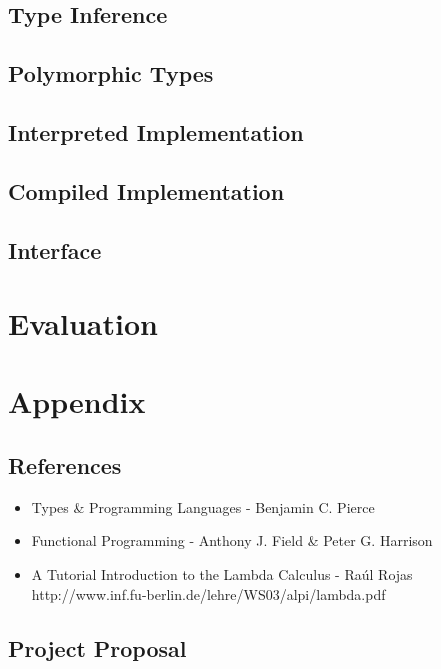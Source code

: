 \documentclass{article}
\begin{document}
\subsection{Type Inference}
\subsection{Polymorphic Types}
\subsection{Interpreted Implementation}
\subsection{Compiled Implementation}
\subsection{Interface}

\pagebreak
\section{Evaluation}

\pagebreak
\section{Appendix}
\subsection{References}
\begin{itemize}
    \item Types \& Programming Languages - Benjamin C. Pierce
    \item Functional Programming - Anthony J. Field \& Peter G. Harrison
    \item A Tutorial Introduction to the Lambda Calculus - Ra\'{u}l Rojas \\
        http://www.inf.fu-berlin.de/lehre/WS03/alpi/lambda.pdf
\end{itemize}

\subsection{Project Proposal}
\end{document}
